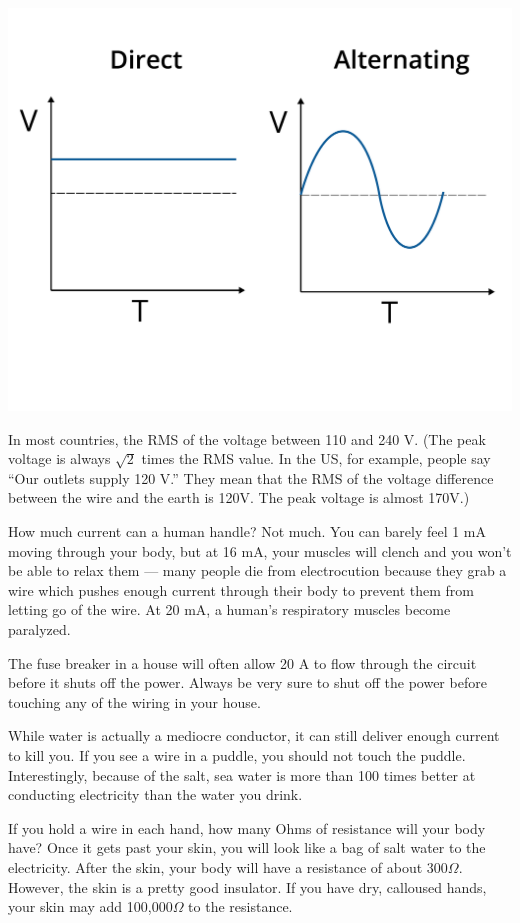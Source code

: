 \includegraphics[width=.75\textwidth]{AC_vs_DC.png}

In most countries, the RMS of the voltage between 110 and 240 V. (The
peak voltage is always $\sqrt{2}$ times the RMS value. In the US, for
example, people say ``Our outlets supply 120 V.'' They mean that the
RMS of the voltage difference between the wire and the earth is 120V.
The peak voltage is almost 170V.)

How much current can a human handle? Not much. You can barely feel 1
mA moving through your body, but at 16 mA, your muscles will clench
and you won't be able to relax them --- many people die from
electrocution because they grab a wire which pushes enough current
through their body to prevent them from letting go of the wire. At 20
mA, a human's respiratory muscles become paralyzed.

The fuse breaker in a house will often allow 20 A to flow through the
circuit before it shuts off the power. Always be very sure to shut off
the power before touching any of the wiring in your house.

While water is actually a mediocre conductor, it can still deliver enough current
to kill you. If you see a wire in a puddle, you should not touch the
puddle. Interestingly, because of the salt, sea water is more than
100 times better at conducting electricity than the water you drink.


If you hold a wire in each hand, how many Ohms of resistance will your
body have? Once it gets past your skin, you will look like a bag of
salt water to the electricity. After the skin, your body will have a
resistance of about 300$\Omega$. However, the skin is a pretty good
insulator. If you have dry, calloused hands, your skin may add
100,000$\Omega$ to the resistance.


